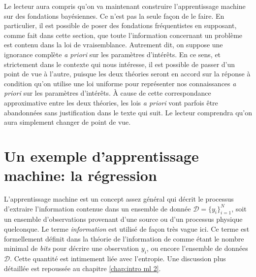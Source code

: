 Le lecteur aura compris qu'on va maintenant construire l'apprentissage machine sur des fondations bayésiennes. Ce n'est pas la seule façon de le 
faire. En particulier, il est possible de poser des fondations fréquentistes en supposant, comme fait dans cette section, que toute l'information 
concernant un problème est contenu dans la loi de vraisemblance. Autrement dit, on suppose une ignorance complète \textit{a priori} sur les paramètres d'intérêts. 
En ce sens, et strictement dans le contexte qui nous intéresse, il est possible de passer d'un point de vue à l'autre, puisque les deux théories seront en accord 
sur la réponse à condition qu'on utilise une loi uniforme pour représenter nos connaissances \textit{a priori} sur les paramètres d'intérêts. 
À cause de cette correspondance approximative entre les deux théories, les lois 
\textit{a priori} vont parfois être abandonnées sans justification dans le texte qui suit. 
Le lecteur comprendra qu'on aura simplement changer de point de vue. 

\section{Un exemple d'apprentissage machine: la régression}\label{sec:app classique}

L'apprentissage machine est un concept assez général qui décrit le processus d'extraire l'information contenue 
dans un ensemble de donnée $\mathcal{D} = \{y_i\}_{i=1}^{N}$, soit un ensemble d'observations provenant d'une source ou d'un processus 
physique quelconque. Le terme \textit{information} est utilisé de façon très vague ici. Ce terme est formellement définit dans la théorie 
de l'information de \citet{Shannon1948} comme étant le nombre minimal de \textit{bits} pour décrire une observation $y_i$, ou encore 
l'ensemble de données $\mathcal{D}$. Cette quantité est intimement liée avec l'entropie. Une discussion plus détaillée est 
repoussée au chapitre \ref{chap:intro ml 2}.

